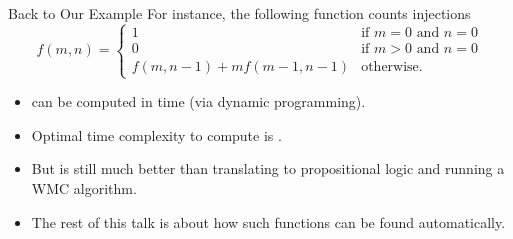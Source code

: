 \documentclass{beamer}
\begin{document}
\begin{frame}{Back to Our Example}
  For instance, the following function counts injections
  \[
  f(m, n) =
  \begin{cases}
    1 & \text{if } m = 0 \text{ and } n = 0 \\
    0 & \text{if } m > 0 \text{ and } n = 0 \\
    f(m, n-1) + mf(m-1, n-1) & \text{otherwise.}
  \end{cases}
  \]
  \pause
  \begin{itemize}
    \item {} can be computed in  time (via
          dynamic programming).
    \item Optimal time complexity to compute  is
          .
    \item But  is still much better than translating to
          propositional logic and running a WMC algorithm.
    \item The rest of this talk is about how such functions can be found
          automatically.
  \end{itemize}
\end{frame}
\end{document}
